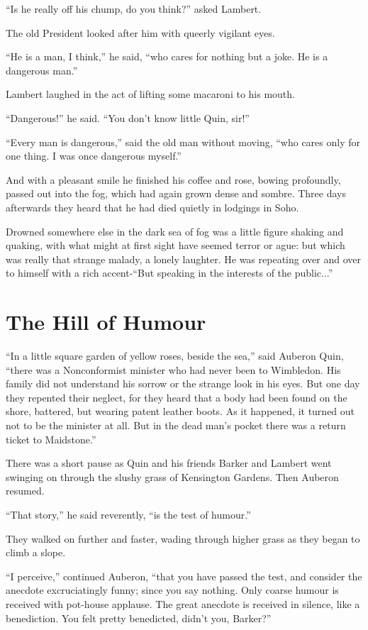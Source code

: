 \documentclass{book}
\begin{document}
“Is he really off his chump, do you think?” asked Lambert.

The old President looked after him with queerly vigilant eyes.

“He is a man, I think,” he said, “who cares for nothing but a joke. He is a dangerous man.”

Lambert laughed in the act of lifting some macaroni to his mouth.

“Dangerous!” he said. “You don’t know little Quin, sir!”

“Every man is dangerous,” said the old man without moving, “who cares only for one thing. I was once dangerous myself.”

And with a pleasant smile he finished his coffee and rose, bowing profoundly, passed out into the fog, which had again grown dense and sombre. Three days afterwards they heard that he had died quietly in lodgings in Soho.

Drowned somewhere else in the dark sea of fog was a little figure shaking and quaking, with what might at first sight have seemed terror or ague: but which was really that strange malady, a lonely laughter. He was repeating over and over to himself with a rich accent-“But speaking in the interests of the public...”

\chapter{The Hill of Humour}
\label{chapter-3}
“In a little square garden of yellow roses, beside the sea,” said Auberon Quin, “there was a Nonconformist minister who had never been to Wimbledon. His family did not understand his sorrow or the strange look in his eyes. But one day they repented their neglect, for they heard that a body had been found on the shore, battered, but wearing patent leather boots. As it happened, it turned out not to be the minister at all. But in the dead man’s pocket there was a return ticket to Maidstone.”

There was a short pause as Quin and his friends Barker and Lambert went swinging on through the slushy grass of Kensington Gardens. Then Auberon resumed.

“That story,” he said reverently, “is the test of humour.”

They walked on further and faster, wading through higher grass as they began to climb a slope.

“I perceive,” continued Auberon, “that you have passed the test, and consider the anecdote excruciatingly funny; since you say nothing. Only coarse humour is received with pot-house applause. The great anecdote is received in silence, like a benediction. You felt pretty benedicted, didn’t you, Barker?”
\end{document}
